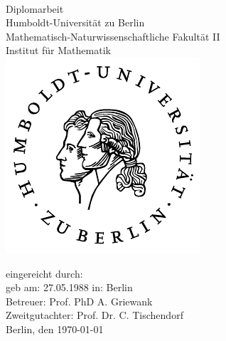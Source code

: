 \begin{spacing}{1}
\begin{titlepage}
\begin{otherlanguage}{ngerman}
\enlargethispage{4\baselineskip}
\vspace{3cm}
\begin{center}
	\Huge{\bfseries\thetitle}\\[1cm]
	\LARGE{Diplomarbeit}\\[1cm]
	\normalsize{
	Humboldt-Universität zu Berlin\\
	Mathematisch-Naturwissenschaftliche Fakultät II\\
	Institut für Mathematik\\[1cm]
	}
	\includegraphics[height=0.3\textheight]{img/plain/husiegel.pdf}\\[0.5cm]
\end{center}
\vfill

\begin{flushleft}
\large{
eingereicht durch: \theauthor\\
geb am: 27.05.1988 \quad in: Berlin\\
Betreuer: Prof. PhD A. Griewank\\
Zweitgutachter: Prof. Dr. C. Tischendorf\\
Berlin, den \today
}
\end{flushleft}
\end{otherlanguage}
\end{titlepage}
\tableofcontents

\renewcommand*\listfigurename{Darstellungsverzeichnis}
\listoffigures
\end{spacing}